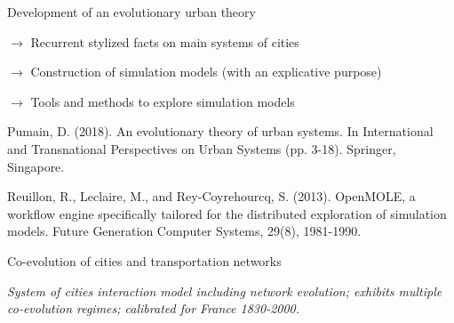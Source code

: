 \documentclass[12pt]{iopart}
\begin{document}




	Development of an evolutionary urban theory
	
	 \nocite{pumain2018evolutionary}
	
	\medskip

	$\rightarrow$ Recurrent stylized facts on main systems of cities
	
	$\rightarrow$ Construction of simulation models (with an explicative purpose)
	
	$\rightarrow$ Tools and methods to explore simulation models
	
	\smallskip
	
		


\nocite{pumain2018evolutionary}

Pumain, D. (2018). An evolutionary theory of urban systems. In International and Transnational Perspectives on Urban Systems (pp. 3-18). Springer, Singapore.

\nocite{reuillon2013openmole}

Reuillon, R., Leclaire, M., and Rey-Coyrehourcq, S. (2013). OpenMOLE, a workflow engine specifically tailored for the distributed exploration of simulation models. Future Generation Computer Systems, 29(8), 1981-1990.





Co-evolution of cities and transportation networks



\textit{System of cities interaction model including network evolution; exhibits multiple co-evolution regimes; calibrated for France 1830-2000.}

\medskip

\end{document}
